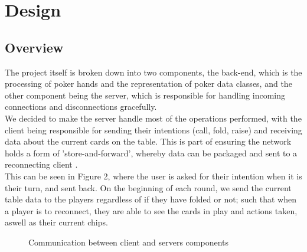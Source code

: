 \documentclass[11pt]{article}
\begin{document}

\newpage
\section{Design}

\subsection{Overview}

The project itself is broken down into two components, the back-end, which is the processing of poker hands and the representation of poker data classes, and the other component being the server, which is responsible for handling incoming connections and disconnections gracefully.  \\

We decided to make the server handle most of the operations performed, with the client being responsible for sending their intentions (call, fold, raise) and receiving data about the current cards on the table. This is part of ensuring the network holds a form of 'store-and-forward', whereby data can be packaged and sent to a reconnecting client \cite{ieee_storefwd}. \\

This can be seen in Figure 2, where the user is asked for their intention when it is their turn, and sent back. On the beginning of each round, we send the current table data to the players regardless of if they have folded or not; such that when a player is to reconnect, they are able to see the cards in play and actions taken, aswell as their current chips.

\noindent
	\begin{figure}[h]
%
\caption{Communication between client and servers components}
	\end{figure} 
	
\end{document}
